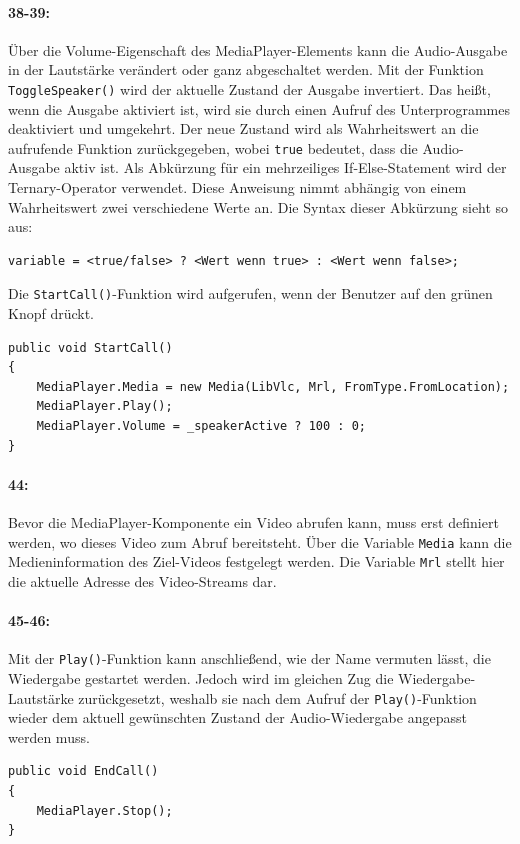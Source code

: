 \paragraph{38-39:} Über die Volume-Eigenschaft des MediaPlayer-Elements kann die Audio-Ausgabe in der Lautstärke verändert oder ganz abgeschaltet werden. Mit der Funktion \texttt{ToggleSpeaker()} wird der aktuelle Zustand der Ausgabe invertiert.
Das heißt, wenn die Ausgabe aktiviert ist, wird sie durch einen Aufruf des Unterprogrammes deaktiviert und umgekehrt.
Der neue Zustand wird als Wahrheitswert an die aufrufende Funktion zurückgegeben, wobei \texttt{true} bedeutet, dass die Audio-Ausgabe aktiv ist.
Als Abkürzung für ein mehrzeiliges If-Else-Statement wird der Ternary-Operator verwendet.
Diese Anweisung nimmt abhängig von einem Wahrheitswert zwei verschiedene Werte an.
Die Syntax dieser Abkürzung sieht so aus:
\begin{verbatim}
variable = <true/false> ? <Wert wenn true> : <Wert wenn false>;
\end{verbatim}

Die \texttt{StartCall()}-Funktion wird aufgerufen, wenn der Benutzer auf den grünen Knopf drückt.
\begin{verbatim}
public void StartCall()
{
    MediaPlayer.Media = new Media(LibVlc, Mrl, FromType.FromLocation);
    MediaPlayer.Play();
    MediaPlayer.Volume = _speakerActive ? 100 : 0;
}
\end{verbatim}
\paragraph{44:} Bevor die MediaPlayer-Komponente ein Video abrufen kann, muss erst definiert werden, wo dieses Video zum Abruf bereitsteht. 
Über die Variable \texttt{Media} kann die Medieninformation des Ziel-Videos festgelegt werden. Die Variable \texttt{Mrl} stellt hier die aktuelle Adresse des Video-Streams dar.
\paragraph{45-46:} Mit der \texttt{Play()}-Funktion kann anschließend, wie der Name vermuten lässt, die Wiedergabe gestartet werden.
Jedoch wird im gleichen Zug die Wiedergabe-Lautstärke zurückgesetzt, weshalb sie nach dem Aufruf der \texttt{Play()}-Funktion wieder dem aktuell gewünschten Zustand der Audio-Wiedergabe angepasst werden muss.\par

\begin{verbatim}
public void EndCall()
{
    MediaPlayer.Stop();
}
\end{verbatim}
